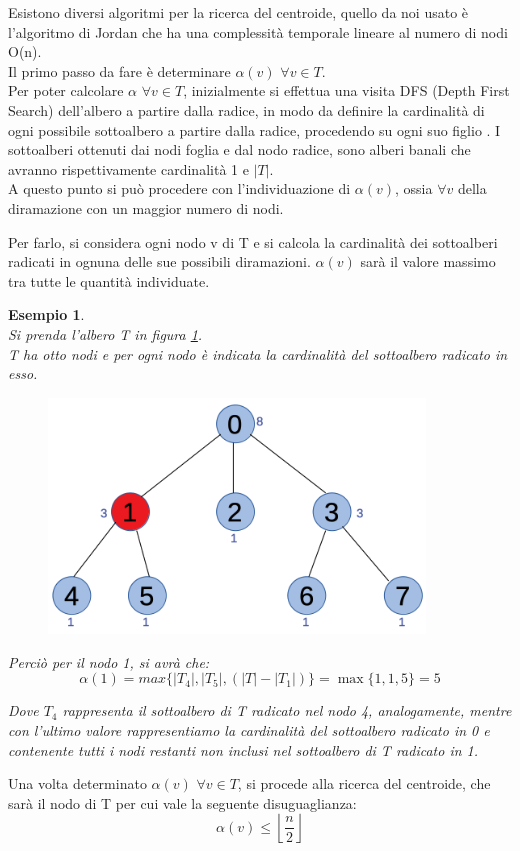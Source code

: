 Esistono diversi algoritmi per la ricerca del centroide, quello da noi usato \`e l'algoritmo di Jordan che  ha una complessit\`a temporale lineare al numero di nodi O(n). \\
Il primo passo da fare \`e determinare $\alpha(v)$ $\forall v \in T$.\\
Per poter calcolare $\alpha$ $\forall v \in T$, inizialmente si effettua una visita DFS (Depth First Search) dell'albero a partire dalla radice, in modo da definire la cardinalit\`a di ogni possibile sottoalbero a partire dalla radice, procedendo su ogni suo figlio .
I sottoalberi ottenuti dai nodi foglia e dal nodo radice, sono alberi banali che avranno rispettivamente cardinalit\`a 1 e $|T|$. \\
A questo punto si pu\`o procedere con l'individuazione di $\alpha (v)$, ossia $\forall v$ della diramazione con un maggior numero di nodi.

Per farlo, si considera ogni nodo v di T e si calcola la cardinalit\`a dei sottoalberi radicati in ognuna delle sue possibili diramazioni. 
$\alpha (v)$ sar\`a il valore massimo tra tutte le quantit\`a individuate.
\\
\newtheorem{esempio}[definizione]{Esempio}
\begin{esempio}\mbox{}\\
Si prenda l’albero T in figura \ref{fig:1}.\\ 
T ha otto nodi e per ogni nodo \`e indicata la cardinalit\`a del sottoalbero radicato in esso.
\\
	\begin{figure}[htbp]
	\centering
	\includegraphics[width=10cm]{capitolo3/1}
	\caption{}
	\label{fig:1}
\end{figure}

Perci\`o per il nodo {\color{red} 1}, si avr\`a che:
\begin{equation*}
\alpha(1) = max {\{ |T_4| , |T_5| , (|T| - |T_1| )\}} = \max{\{1, 1, 5\} }  = 5
\end{equation*}

Dove $T_4$ rappresenta il sottoalbero di T radicato nel nodo 4, analogamente, mentre con l’ultimo valore rappresentiamo la cardinalit\`a del sottoalbero radicato in 0 e contenente tutti i nodi restanti non inclusi nel sottoalbero di T radicato in 1. 
\end{esempio}
Una volta determinato $\alpha(v)$ $\forall v \in T$, si procede alla ricerca del centroide, che sar\`a il nodo di T per cui vale la seguente disuguaglianza:
\begin{equation*}
\alpha(v) \le \left\lfloor\frac{n}{2} \right\rfloor
\end{equation*}

